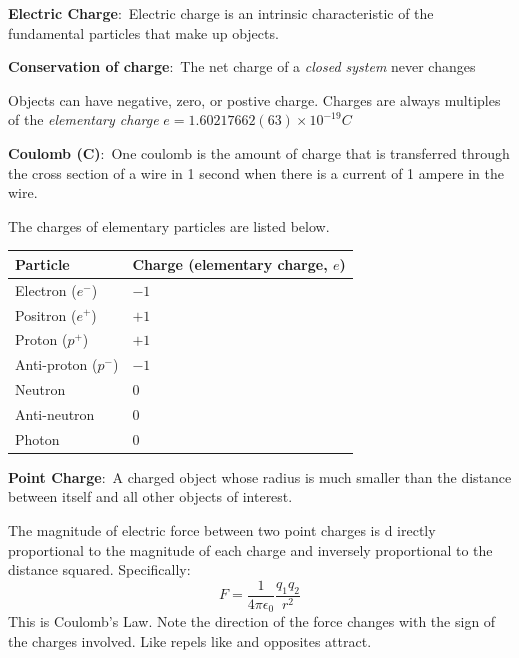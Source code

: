 \documentclass[nobib]{tufte-handout}
\newcommand{\defn}[2]{\noindent\textbf{#1}:\ #2}
\begin{document}
\defn{Electric Charge}{Electric charge is an intrinsic characteristic of the
fundamental particles that make up objects.}


\defn{Conservation of charge}{The net charge of a \emph{closed system} never changes}

Objects can have negative, zero, or postive charge. 
Charges are always multiples of the \emph{elementary charge} $e = 1.60217662(63) \times 10^{-19} C$

\defn{Coulomb (C)}{One coulomb is the amount of charge that is
transferred through the cross section of a wire in 1 second
when there is a current of 1 ampere in the wire.}

The charges of elementary particles are listed below.
\begin{table}[ht]
    \centering
    \begin{tabular}{@{}ll@{}}
    \toprule
    Particle & Charge (elementary charge, $e$) \\
    \midrule
    Electron ($e^-$) & $-1$ \\
    Positron ($e^+$) & $+1$ \\
    Proton ($p^+$) & $+1$ \\
    Anti-proton ($p^-$) & $-1$ \\
    Neutron& $0$ \\
    Anti-neutron & $0$ \\
    Photon& $0$ \\
    \bottomrule
    \end{tabular}
    \end{table}

\defn{Point Charge}{A charged object whose
radius is much smaller than the distance
between itself and all other objects of
interest.}

The magnitude of electric force between two point charges is d
irectly proportional to the magnitude of each charge and 
inversely proportional to the distance squared. Specifically:
\[F = \frac{1}{4\pi \epsilon_0}\frac{q_1 q_2}{r^2}\]
This is Coulomb's Law. Note the direction of the force changes
with the sign of the charges involved. Like repels like and opposites
attract. 
\end{document}
